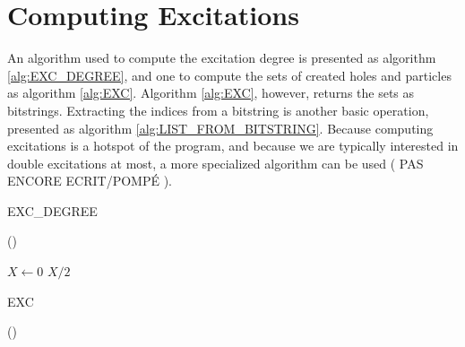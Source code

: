 \documentclass[./thesis.tex]{subfiles}
\begin{document}
\section{Computing Excitations}

An algorithm used to compute the excitation degree is presented as algorithm \ref{alg:EXC_DEGREE}, and one to compute the sets of created holes and particles as algorithm \ref{alg:EXC}. Algorithm \ref{alg:EXC}, however, returns the sets as bitstrings. Extracting the indices from a bitstring is another basic operation, presented as algorithm \ref{alg:LIST_FROM_BITSTRING}.
Because computing excitations is a hotspot of the program, and because we are typically interested in double excitations at most, a more specialized algorithm can be used ( PAS ENCORE ECRIT/POMPÉ ).


\begin{algorithm}[h!]
	\caption{EXC\_DEGREE}
	\label{alg:EXC_DEGREE}
	
	\Fn(){}{

		$X \gets 0$   \;
		\KwRet $X / 2$\;
	}
\end{algorithm}


\begin{algorithm}[H]
	\caption{EXC}
		
	\label{alg:EXC}
	
	\Fn(){}{
		\;
		}
\end{algorithm}
\end{document}
